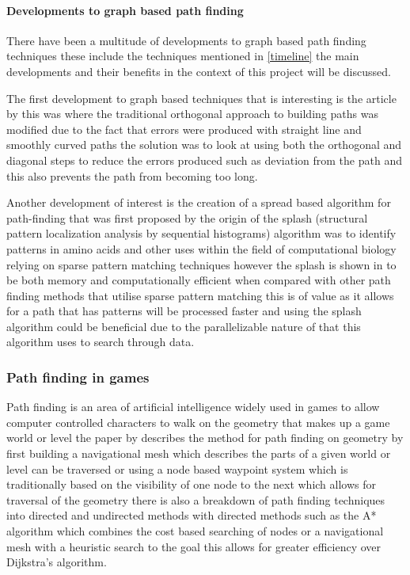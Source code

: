 \paragraph{Developments to graph based path finding}
There have been a multitude of developments to graph based path finding techniques these include the techniques mentioned in \ref{timeline} the main developments and their benefits in the context of this project will be discussed.

The first development to graph based techniques that is interesting is the article by \cite{goodchild} this was where the traditional orthogonal approach to building paths was modified due to the fact that errors were produced with straight line and smoothly curved paths the solution was to look at using both the orthogonal and diagonal steps to reduce the errors produced such as deviation from the path and this also prevents the path from becoming too long.

Another development of interest is the creation of a spread based algorithm for path-finding that was first proposed by \cite{califano} the origin of the splash (structural pattern localization analysis by sequential histograms) algorithm was to identify patterns in amino acids and other uses within the field of computational biology relying on sparse pattern matching techniques however the splash is shown in \cite{califano} to be both memory and computationally efficient when compared with other path finding methods that utilise sparse pattern matching this is of value as it allows for a path that has patterns will be processed faster and using the splash algorithm could be beneficial due to the parallelizable nature of that this algorithm uses to search through data.    


\subsubsection{Path finding in games}
\label{pfg}
Path finding is an area of artificial intelligence widely used in games to allow computer controlled characters to walk on the geometry that makes up a game world or level the paper by \cite{pathfinding-games} describes the method for path finding on geometry by first building a navigational mesh which describes the parts of a given world or level can be traversed or using a node based waypoint system which is traditionally based on the visibility of one node to the next which allows for traversal of the geometry there is also a breakdown of path finding techniques into directed and undirected methods with directed methods such as the A* algorithm which combines the cost based searching of nodes or a navigational mesh with a heuristic search to the goal this allows for greater efficiency over Dijkstra's algorithm.

